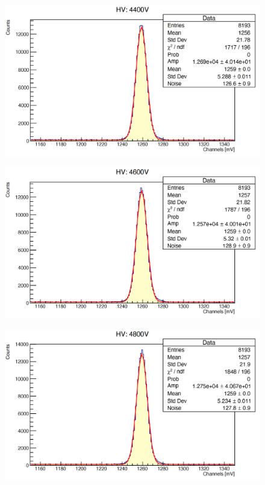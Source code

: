 \documentclass[a4paper,10pt]{article}
\begin{document}
\begin{figure}[H]
    \centering
    \includegraphics[scale=0.45]{appendice/4400}
\end{figure}
\begin{figure}[H]
    \centering
    \includegraphics[scale=0.45]{appendice/4600}
\end{figure}
\begin{figure}[H]
    \centering
    \includegraphics[scale=0.45]{appendice/4800}
\end{figure}
\end{document}
